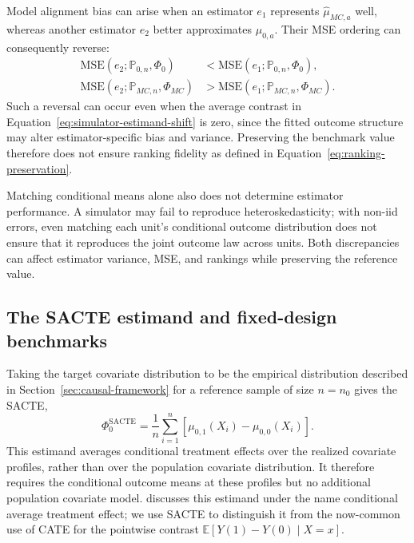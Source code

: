 Model alignment bias can arise when an estimator \(e_1\) represents \(\widehat\mu_{MC,a}\) well, whereas another estimator \(e_2\) better approximates \(\mu_{0,a}\). Their MSE ordering can consequently reverse:
\[
\begin{aligned}
\mathrm{MSE}(e_2;\mathbb P_{0,n},\Phi_0)
&<\mathrm{MSE}(e_1;\mathbb P_{0,n},\Phi_0),\\
\mathrm{MSE}(e_2;\mathbb P_{MC,n},\Phi_{MC})
&>\mathrm{MSE}(e_1;\mathbb P_{MC,n},\Phi_{MC}).
\end{aligned}
\]
Such a reversal can occur even when the average contrast in Equation~\eqref{eq:simulator-estimand-shift} is zero, since the fitted outcome structure may alter estimator-specific bias and variance. Preserving the benchmark value therefore does not ensure ranking fidelity as defined in Equation~\eqref{eq:ranking-preservation}.

Matching conditional means alone also does not determine estimator performance. A simulator may fail to reproduce heteroskedasticity; with non-iid errors, even matching each unit's conditional outcome distribution does not ensure that it reproduces the joint outcome law across units. Both discrepancies can affect estimator variance, MSE, and rankings while preserving the reference value.

\subsection{The SACTE estimand and fixed-design benchmarks}
\label{sec:fixed-design-sacte}

Taking the target covariate distribution to be the empirical distribution described in Section~\ref{sec:causal-framework} for a reference sample of size \(n=n_0\) gives the SACTE,
\begin{equation}
\Phi_0^{\mathrm{SACTE}}
=\frac1n\sum_{i=1}^n
\left[\mu_{0,1}(X_i)-\mu_{0,0}(X_i)\right].
\label{eq:sacte}
\end{equation}
This estimand averages conditional treatment effects over the realized covariate profiles, rather than over the population covariate distribution. It therefore requires the conditional outcome means at these profiles but no additional population covariate model.  discusses this estimand under the name conditional average treatment effect; we use SACTE to distinguish it from the now-common use of CATE for the pointwise contrast \(\mathbb E[Y(1)-Y(0)\mid X=x]\).

